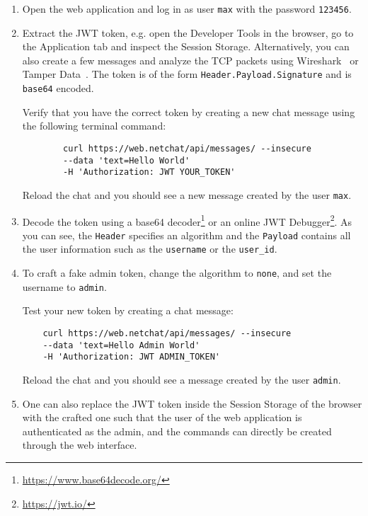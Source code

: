 \documentclass[12pt,a4paper]{article}
\newcommand{\code}[1]{\texttt{#1}}
\begin{document}
\begin{enumerate}
	\item Open the web application and log in as user \code{max} with the password \code{123456}.
	\item Extract the JWT token, e.g. open the Developer Tools in the browser, go to the Application tab and inspect the Session Storage. Alternatively, you can also create a few messages and analyze the TCP packets using Wireshark~\cite{wireshark} or Tamper Data~\cite{tamperdata}. The token is of the form \code{Header.Payload.Signature} and is \code{base64} encoded.
	
	Verify that you have the correct token by creating a new chat message using the following terminal command: 
	\begin{verbatim}
		curl https://web.netchat/api/messages/ --insecure
		--data 'text=Hello World'
		-H 'Authorization: JWT YOUR_TOKEN'
	\end{verbatim}
	
	Reload the chat and you should see a new message created by the user \code{max}.
	
	\item Decode the token using a base64 decoder\footnote{\url{https://www.base64decode.org/}} or an online JWT Debugger\footnote{\url{https://jwt.io/}}. As you can see, the \code{Header} specifies an algorithm and the \code{Payload} contains all the user information such as the \code{username} or the \code{user\_id}. 
	\item To craft a fake admin token, change the algorithm to \code{none}, and set the username to \code{admin}.
	
	Test your new token by creating a chat message:
	\begin{verbatim}
	curl https://web.netchat/api/messages/ --insecure
	--data 'text=Hello Admin World'
	-H 'Authorization: JWT ADMIN_TOKEN'
	\end{verbatim}
	
	Reload the chat and you should see a message created by the user \code{admin}.
	
	\item One can also replace the JWT token inside the Session Storage of the browser with the crafted one such that the user of the web application is authenticated as the admin, and the commands can directly be created through the web interface.
	 
\end{enumerate}
\end{document}
